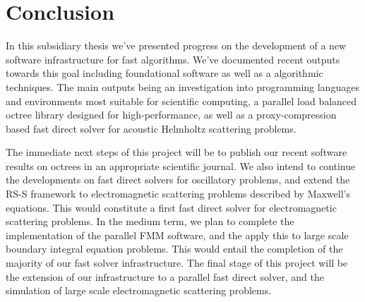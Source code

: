 \chapter{Conclusion}\label{chpt:conclusion}

In this subsidiary thesis we've presented progress on the development of a new software infrastructure for fast algorithms. We've documented recent outputs towards this goal including foundational software as well as a algorithmic techniques. The main outputs being an investigation into programming languages and environments most suitable for scientific computing, a parallel load balanced octree library designed for high-performance,  as well as a proxy-compression based fast direct solver for acoustic Helmholtz scattering problems.

The immediate next steps of this project will be to publish our recent software results on octrees in an appropriate scientific journal. We also intend to continue the developments on fast direct solvers for oscillatory problems, and extend the RS-S framework to electromagnetic scattering problems described by Maxwell's equations. This would constitute a first fast direct solver for electromagnetic scattering problems. In the medium term, we plan to complete the implementation of the parallel FMM software, and the apply this to large scale boundary integral equation problems. This would entail the completion of the majority of our fast solver infrastructure. The final stage of this project will be the extension of our infrastructure to a parallel fast direct solver, and the simulation of large scale electromagnetic scattering problems.